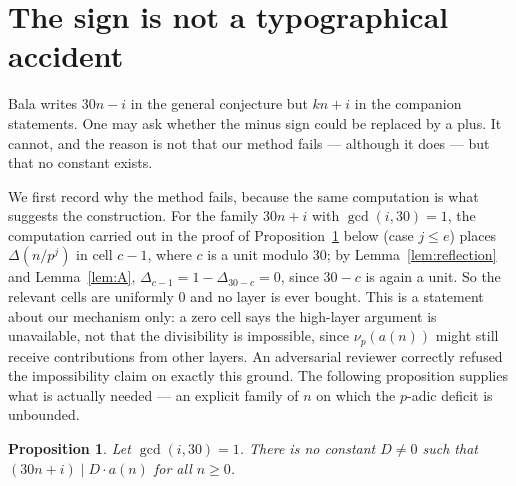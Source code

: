 \documentclass[11pt]{article}
\theoremstyle{plain}
\newtheorem{proposition}[theorem]{Proposition}
\theoremstyle{definition}
\theoremstyle{remark}
\numberwithin{equation}{section}
\begin{document}
\section{The sign is not a typographical accident}
\label{sec:sign}

Bala writes $30n - i$ in the general conjecture but $kn + i$ in the companion statements. One may
ask whether the minus sign could be replaced by a plus. It cannot, and the reason is not that our
method fails --- although it does --- but that no constant exists.

We first record why the method fails, because the same computation is what suggests the
construction. For the family $30n+i$ with $\gcd(i,30)=1$, the computation carried out in the
proof of Proposition~\ref{prop:impossible} below (case $j \le e$) places $\Delta(n/p^j)$ in cell
$c-1$, where $c$ is a unit modulo $30$; by Lemma~\ref{lem:reflection} and Lemma~\ref{lem:A},
$\Delta_{c-1} = 1 - \Delta_{30-c} = 0$, since $30-c$ is again a unit. So the relevant cells are
uniformly $0$ and no layer is ever bought. This is a statement about our mechanism only: a zero
cell says the high-layer argument is unavailable, not that the divisibility is impossible, since
$\nu_p(a(n))$ might still receive contributions from other layers. An adversarial reviewer
correctly refused the impossibility claim on exactly this ground. The following proposition
supplies what is actually needed --- an explicit family of $n$ on which the $p$-adic deficit is
unbounded.

\begin{proposition}
\label{prop:impossible}
Let $\gcd(i,30) = 1$. There is no constant $D \ne 0$ such that $(30n+i) \mid D\cdot a(n)$ for all
$n \ge 0$.
\end{proposition}
\end{document}
